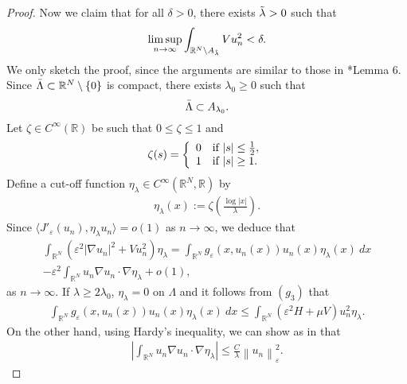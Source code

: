 \documentclass[a4paper]{amsart}
\begin{document}
\begin{proof}
Now we claim that for all $\delta > 0$, there exists $\Tilde{\lambda} > 0$ such that
\begin{align}\label{ps:claim2}
  \limsup_{n \rightarrow \infty} \int_{{\mathbb{R}}^N\setminus A_{\Tilde{\lambda}}} V u_n^2 < \delta.
\end{align}
We only sketch the proof, since the arguments are similar to those in \cite{BVS}*{Lemma 6}. 
Since $\Bar{\Lambda} \subset {\mathbb{R}}^N \setminus \{0\}$ is compact, there exists $\lambda_0 \geq 0$ such that 
\[
 \Bar{\Lambda} \subset A_{\lambda_0}.
\]
Let $\zeta \in C^{\infty}({\mathbb{R}})$ be such that $0 \leq \zeta \leq 1$ and
\begin{align*}
  \zeta(s) = \left\{ \begin{array}{ll} 0 & \textnormal{if}\ {\left| {s} \right|} \leq \frac{1}{2}, \\
  1 & \textnormal{if}\ {\left| {s} \right|} \geq 1. 
  \end{array} 
  \right.
\end{align*}
Define a cut-off function $\eta_{\lambda} \in C^{\infty}({\mathbb{R}}^N,{\mathbb{R}})$ by
 \begin{align*}
  \eta_{\lambda}(x) := \zeta\left( \frac{\log {\left| {x} \right|}}{\lambda} \right).
 \end{align*}
Since $\langle J'_{\varepsilon}(u_n),\eta_{\lambda}u_n\rangle = o(1)$ as $n \to \infty$, we deduce that
 \begin{multline}\label{ps3}
	\int_{{\mathbb{R}}^N} \left( \varepsilon^2 {\left| {\nabla u_n} \right|}^2 + V u_n^2 \right)\eta_{\lambda} = \int_{{\mathbb{R}}^N} g_{\varepsilon}(x, u_n(x))
u_n(x) \eta_{\lambda}(x)\: dx  \\
- \varepsilon^2 \int_{{\mathbb{R}}^N} u_n \nabla u_n \cdot \nabla \eta_{\lambda} + o(1),
 \end{multline}
as $n \to \infty$.
If $\lambda \geq 2\lambda_0$, $\eta_\lambda=0$ on $\Lambda$ and it follows from $(g_3)$ that
 \begin{align}\label{ps4}
  \int_{{\mathbb{R}}^N} g_{\varepsilon}(x,u_n(x)) u_n(x) \eta_{\lambda}(x)\: dx \leq \int_{{\mathbb{R}}^N} \left( \varepsilon^2 H + \mu V \right)
u_n^2 \eta_{\lambda}.
 \end{align}
On the other hand, using Hardy's inequality, we can show as in \cite{BVS} that
 \begin{align}\label{ps5}
  {\left| {\int_{{\mathbb{R}}^N} u_n \nabla u_n \cdot \nabla \eta_{\lambda}} \right|} \leq \frac{C}{\lambda} {\left\| {u_n} \right\|}_{\varepsilon}^2.
 \end{align}

\end{proof}
\end{document}
